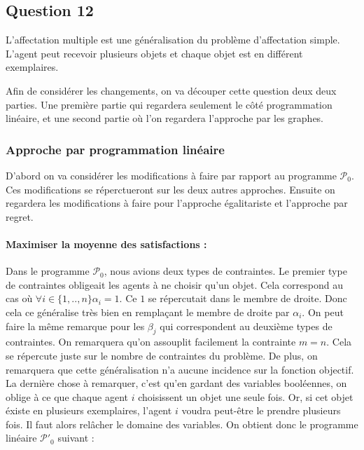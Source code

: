 \documentclass[a4paper, titlepage, oneside, 12pt]{article}%
\begin{document}
\subsection{Question 12}

L'affectation multiple est une généralisation du problème d'affectation simple. L'agent peut recevoir plusieurs objets et chaque objet est en différent exemplaires.

Afin de considérer les changements, on va découper cette question deux deux parties. Une première partie qui regardera seulement le côté programmation linéaire, et une second partie où l'on regardera l'approche par les graphes.

\subsubsection{Approche par programmation linéaire}

D'abord on va considérer les modifications à faire par rapport au programme $\mathcal{P}_0$. Ces modifications se réperctueront sur les deux autres approches. Ensuite on regardera les modifications à faire pour l'approche égalitariste et l'approche par regret.

\paragraph{Maximiser la moyenne des satisfactions : }

Dans le programme $\mathcal{P}_0$, nous avions deux types de contraintes. Le premier type de contraintes obligeait les agents à ne choisir qu'un objet. Cela correspond au cas où $\forall i \in \{1,..,n\} \alpha_i =1$. Ce $1$ se répercutait dans le membre de droite. Donc cela ce généralise très bien en remplaçant le membre de droite par $\alpha_i$. On peut faire la même remarque pour les $\beta_j$ qui correspondent au deuxième types de contraintes. On remarquera qu'on assouplit facilement la contrainte $m=n$. Cela se répercute juste sur le nombre de contraintes du problème. De plus, on remarquera que cette généralisation n'a aucune incidence sur la fonction objectif. La dernière chose à remarquer, c'est qu'en gardant des variables booléennes, on oblige à ce que chaque agent $i$ choisissent un objet une seule fois. Or, si cet objet éxiste en plusieurs exemplaires, l'agent $i$ voudra peut-être le prendre plusieurs fois. Il faut alors relâcher le domaine des variables. On obtient donc le programme linéaire $\mathcal{P'}_0$ suivant :
\end{document}
